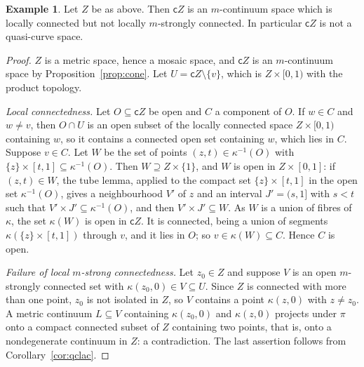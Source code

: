 \documentclass[11pt]{amsart}
\theoremstyle{definition}
\newtheorem{example}[theorem]{Example}
\theoremstyle{remark}
\newcommand{\cone}{\mathsf{c}}
\numberwithin{equation}{section}
\begin{document}
\begin{example}\label{ex:cZ}
Let $Z$ be as above. Then $\cone Z$ is an $m$-continuum space which is locally connected but not locally $m$-strongly connected. In particular $\cone Z$ is not a quasi-curve space.
\end{example}
\begin{proof}
$Z$ is a metric space, hence a mosaic space, and $\cone Z$ is an $m$-continuum space by Proposition~\ref{prop:cone}. Let $U=\cone Z\setminus\{v\}$, which is $Z\times[0,1)$ with the product topology.

\emph{Local connectedness.} Let $O\subseteq\cone Z$ be open and $C$ a component of $O$. If $w\in C$ and $w\ne v$, then $O\cap U$ is an open subset of the locally connected space $Z\times[0,1)$ containing $w$, so it contains a connected open set containing $w$, which lies in $C$. Suppose $v\in C$. Let $W$ be the set of points $(z,t)\in\kappa^{-1}(O)$ with $\{z\}\times[t,1]\subseteq\kappa^{-1}(O)$. Then $W\supseteq Z\times\{1\}$, and $W$ is open in $Z\times[0,1]$: if $(z,t)\in W$, the tube lemma, applied to the compact set $\{z\}\times[t,1]$ in the open set $\kappa^{-1}(O)$, gives a neighbourhood $V'$ of $z$ and an interval $J'=(s,1]$ with $s<t$ such that $V'\times J'\subseteq\kappa^{-1}(O)$, and then $V'\times J'\subseteq W$. As $W$ is a union of fibres of $\kappa$, the set $\kappa(W)$ is open in $\cone Z$. It is connected, being a union of segments $\kappa(\{z\}\times[t,1])$ through $v$, and it lies in $O$; so $v\in\kappa(W)\subseteq C$. Hence $C$ is open.

\emph{Failure of local $m$-strong connectedness.} Let $z_0\in Z$ and suppose $V$ is an open $m$-strongly connected set with $\kappa(z_0,0)\in V\subseteq U$. Since $Z$ is connected with more than one point, $z_0$ is not isolated in $Z$, so $V$ contains a point $\kappa(z,0)$ with $z\ne z_0$. A metric continuum $L\subseteq V$ containing $\kappa(z_0,0)$ and $\kappa(z,0)$ projects under $\pi$ onto a compact connected subset of $Z$ containing two points, that is, onto a nondegenerate continuum in $Z$: a contradiction. The last assertion follows from Corollary~\ref{cor:qclac}.
\end{proof}
\end{document}
